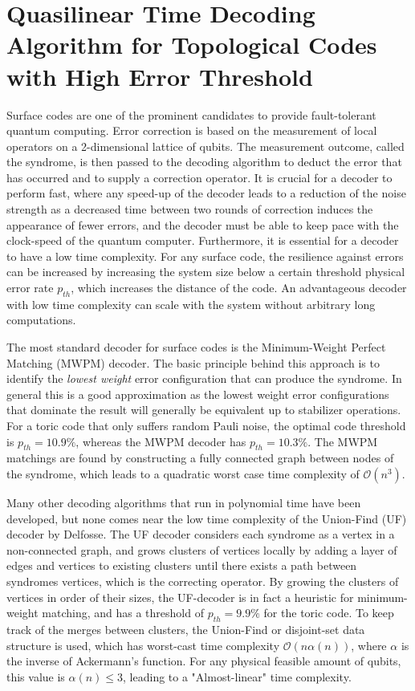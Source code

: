 \documentclass[11pt, a4paper, twoside, titlepage, usenames,dvipsnames]{report}
\begin{document}
\section*{Quasilinear Time Decoding Algorithm for Topological Codes with High Error Threshold}

Surface codes are one of the prominent candidates to provide fault-tolerant quantum computing. Error correction is based on the measurement of local operators on a 2-dimensional lattice of qubits. The measurement outcome, called the syndrome, is then passed to the decoding algorithm to deduct the error that has occurred and to supply a correction operator. It is crucial for a decoder to perform fast, where any speed-up of the decoder leads to a reduction of the noise strength as a decreased time between two rounds of correction induces the appearance of fewer errors, and the decoder must be able to keep pace with the clock-speed of the quantum computer. Furthermore, it is essential for a decoder to have a low time complexity. For any surface code, the resilience against errors can be increased by increasing the system size below a certain threshold physical error rate $p_{th}$, which increases the distance of the code. An advantageous decoder with low time complexity can scale with the system without arbitrary long computations.

The most standard decoder for surface codes is the Minimum-Weight Perfect Matching (MWPM) decoder. The basic principle behind this approach is to identify the \emph{lowest weight} error configuration that can produce the syndrome. In general this is a good approximation as the lowest weight error configurations that dominate the result will generally be equivalent up to stabilizer operations. For a toric code that only suffers random Pauli noise, the optimal code threshold is $p_{th} = 10.9\%$, whereas the MWPM decoder has $p_{th} = 10.3\%$. The MWPM matchings are found by constructing a fully connected graph between nodes of the syndrome, which leads to a quadratic worst case time complexity of $\mathcal{O}(n^3)$.

Many other decoding algorithms that run in polynomial time have been developed, but none comes near the low time complexity of the Union-Find (UF) decoder by Delfosse. The UF decoder considers each syndrome as a vertex in a non-connected graph, and grows clusters of vertices locally by adding a layer of edges and vertices to existing clusters until there exists a path between syndromes vertices, which is the correcting operator. By growing the clusters of vertices in order of their sizes, the UF-decoder is in fact a heuristic for minimum-weight matching, and has a threshold of $p_{th} = 9.9\%$ for the toric code. To keep track of the merges between clusters, the Union-Find or disjoint-set data structure is used, which has worst-cast time complexity $\mathcal{O}(n\alpha(n))$, where $\alpha$ is the inverse of Ackermann's function. For any physical feasible amount of qubits, this value is $\alpha(n) \leq 3$, leading to a "Almost-linear" time complexity.
\end{document}
